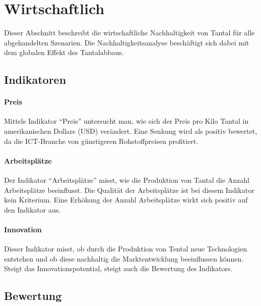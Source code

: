 
\section{Wirtschaftlich}\label{sec:conflict}

Dieser Abschnitt beschreibt die wirtschaftliche Nachhaltigkeit von Tantal für alle abgehandelten Szenarien. Die Nachhaltigkeitsanalyse beschäftigt sich dabei mit dem globalen Effekt des Tantalabbaus.

\subsection{Indikatoren}

\paragraph{Preis}
Mittels Indikator ``Preis'' untersucht man, wie sich der Preis pro Kilo Tantal
in amerikanischen Dollars (USD) verändert. Eine Senkung wird als positiv bewertet, da die ICT-Branche von günstigeren Rohstoffpreisen profitiert. 

\paragraph{Arbeitsplätze}
Der Indikator ``Arbeitsplätze'' misst, wie die Produktion von Tantal die Anzahl
Arbeitsplätze beeinflusst. Die Qualität der Arbeitsplätze ist bei diesem Indikator kein Kriterium. Eine Erhöhung der Anzahl Arbeitsplätze wirkt sich positiv auf den Indikator aus.

\paragraph{Innovation}
Dieser Indikator misst, ob durch die Produktion von Tental neue Technologien
entstehen und ob diese nachhaltig die Marktentwicklung beeinflussen können. Steigt das Innovationspotential, steigt auch die Bewertung des Indikators.

\subsection{Bewertung}

